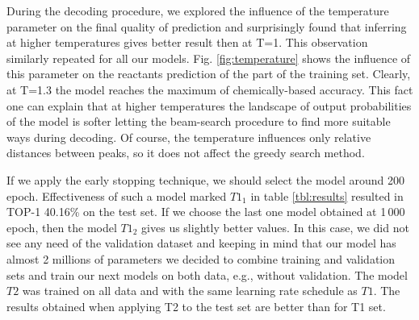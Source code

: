 \documentclass{article}
\begin{document}
During the decoding procedure, we explored the influence of the temperature parameter on the final quality of prediction and surprisingly found that inferring at higher temperatures gives better result then at T=1. This observation similarly repeated for all our models. Fig. \ref{fig:temperature} shows the influence of this parameter on the reactants prediction of the part of the training set. Clearly, at T=1.3 the model reaches the maximum of chemically-based accuracy. This fact one can explain that at higher temperatures the landscape of output probabilities of the model is softer letting the beam-search procedure to find more suitable ways during decoding. Of course, the temperature influences only relative distances between peaks, so it does not affect the greedy search method. 

If we apply the early stopping technique, we should select the model around 200 epoch. Effectiveness of such a model marked $T1_1$ in table \ref{tbl:results} resulted in TOP-1 40.16\% on the test set. If we choose the last one model obtained at 1\,000 epoch, then the model $T1_2$ gives us slightly better values. In this case, we did not see any need of the validation dataset and keeping in mind that our model has almost 2 millions of parameters we decided to combine training and validation sets and train our next models on both data, e.g., without validation. The model $T2$ was trained on all data and with the same learning rate schedule as $T1$. The results obtained when applying T2 to the test set are better than for T1 set.
\end{document}
